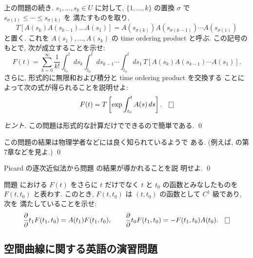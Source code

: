 \documentclass[12pt,twoside]{jarticle}
\begin{document}
\begin{question}\label{q:DS2}
  上の問題の続き. $s_1,\dots,s_k\in U$ に対して, %
  $\{1,\dots,k\}$ の置換 $\sigma$ で %
  $s_{\sigma(1)} \le \cdots \le s_{\sigma(k)}$ を
  満たすものを取り, 
  \[
    T[A(s_k) A(s_{k-1}) \dots A(s_1)]
    =
    A(s_{\sigma(k)}) A(s_{\sigma(k-1)}) \cdots A(s_{\sigma(1)})
  \]
  と置く. これを $A(s_1),\dots,A(s_k)$ の time ordering product と呼ぶ.
  この記号のもとで, 次が成立することを示せ:
  \[
    F(t)
    =
    \sum_{k=0}^\infty
    \frac{1}{k!}
    \int_{t_0}^t ds_k \int_{t_0}^t ds_{k-1} \cdots \int_{t_0}^t ds_1\,
    T[ A(s_k)A(s_{k-1})\cdots A(s_1) ].
  \]%
  さらに, 形式的に無限和および積分と time ordering product を交換する
  ことによって次の式が得られることを説明せよ:
  \[
    F(t) = T\left[ \exp \int_{t_0}^t A(s)\,ds \right].
  \qed
  \]
\end{question}

\begin{proof}[ヒント]
 この問題は形式的な計算だけでできるので簡単である. \qed
\end{proof}

\begin{rem}
この問題の結果は物理学者などには良く知られているようで
ある. (例えば, \cite{Polyakov} の第7章などを見よ.)
\qed
\end{rem}

\begin{question}\label{q:DS3}
  Picard の逐次近似法から問題  の結果が導かれることを説
  明せよ. \qed
\end{question}

\begin{question}\label{q:DS4}
  問題  における $F(t)$ をさらに $t$ だけでなく $t$ と 
  $t_0$ の函数とみなしたものを $F(t,t_0)$ と表わす. %
  このとき, $F(t, t_0)$ は $(t,t_0)$ の函数として $C^1$ 級であり, 次を
  満たしていることを示せ:
  \[
    \pd{}{t_1} F(t_1,t_0) = A(t_1) F(t_1,t_0),
    \qquad
    \pd{}{t_0} F(t_1,t_0) = - F(t_1,t_0) A(t_0).
  \qed
  \]
\end{question}


\subsection{空間曲線に関する英語の演習問題}
\end{document}
